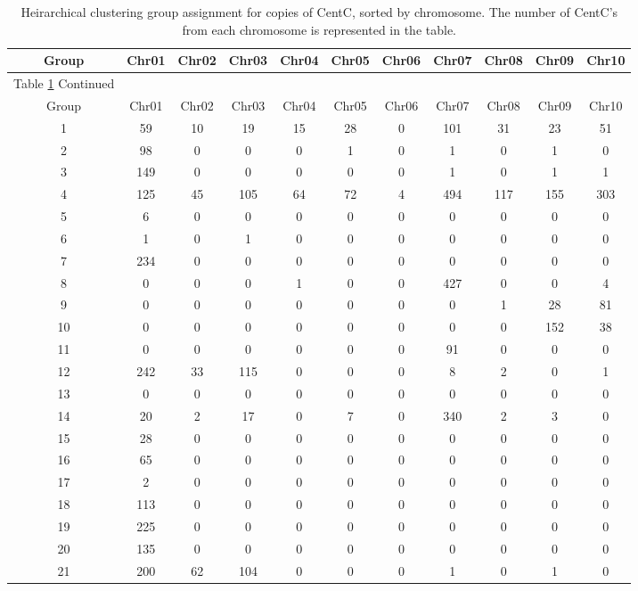 \clearpage
 \begin{longtable}[c]{|c|c|c|c|c|c|c|c|c|c|c|}
 \caption{Heirarchical clustering group assignment for copies of CentC, sorted by chromosome.  The number of CentC's from each chromosome is represented in the table.\label{long}}\\ 
\hline

\hline
Group & Chr01 & Chr02 & Chr03 & Chr04 & Chr05 & Chr06 & Chr07 & Chr08 & Chr09 & Chr10\\
\hline
\endfirsthead

\multicolumn{1}{c}{Table \ref{long} Continued}\\
\hline
Group & Chr01 & Chr02 & Chr03 & Chr04 & Chr05 & Chr06 & Chr07 & Chr08 & Chr09 & Chr10\\ 
\hline
\endhead 
 
1 & 59 & 10 & 19 & 15 & 28 & 0 & 101 & 31 & 23 & 51\\
2 & 98 & 0 & 0 & 0 & 1 & 0 & 1 & 0 & 1 & 0\\
3 & 149 & 0 & 0 & 0 & 0 & 0 & 1 & 0 & 1 & 1\\
4 & 125 & 45 & 105 & 64 & 72 & 4 & 494 & 117 & 155 & 303\\
5 & 6 & 0 & 0 & 0 & 0 & 0 & 0 & 0 & 0 & 0\\
6 & 1 & 0 & 1 & 0 & 0 & 0 & 0 & 0 & 0 & 0\\
7 & 234 & 0 & 0 & 0 & 0 & 0 & 0 & 0 & 0 & 0\\
8 & 0 & 0 & 0 & 1 & 0 & 0 & 427 & 0 & 0 & 4\\
9 & 0 & 0 & 0 & 0 & 0 & 0 & 0 & 1 & 28 & 81\\
10 & 0 & 0 & 0 & 0 & 0 & 0 & 0 & 0 & 152 & 38\\
11 & 0 & 0 & 0 & 0 & 0 & 0 & 91 & 0 & 0 & 0\\
12 & 242 & 33 & 115 & 0 & 0 & 0 & 8 & 2 & 0 & 1\\
13 & 0 & 0 & 0 & 0 & 0 & 0 & 0 & 0 & 0 & 0\\
14 & 20 & 2 & 17 & 0 & 7 & 0 & 340 & 2 & 3 & 0\\
15 & 28 & 0 & 0 & 0 & 0 & 0 & 0 & 0 & 0 & 0\\
16 & 65 & 0 & 0 & 0 & 0 & 0 & 0 & 0 & 0 & 0\\
17 & 2 & 0 & 0 & 0 & 0 & 0 & 0 & 0 & 0 & 0\\
18 & 113 & 0 & 0 & 0 & 0 & 0 & 0 & 0 & 0 & 0\\
19 & 225 & 0 & 0 & 0 & 0 & 0 & 0 & 0 & 0 & 0\\
20 & 135 & 0 & 0 & 0 & 0 & 0 & 0 & 0 & 0 & 0\\
21 & 200 & 62 & 104 & 0 & 0 & 0 & 1 & 0 & 1 & 0\\

\end{longtable}
